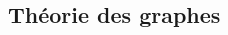 \documentclass[a4paper, 8pt]{article}
\begin{document}
\begin{multicols*}{3}

\section*{Théorie des graphes}

\newcommand{\GXA}{$G = (X,A)$ }


\end{multicols*}
\end{document}
